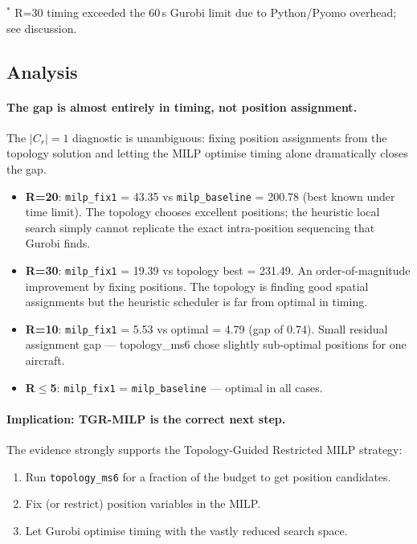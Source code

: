 \noindent $^*$ R=30 timing exceeded the 60\,s Gurobi limit due to Python/Pyomo overhead; see discussion.

\subsection{Analysis}
\label{exp:exp01-analysis}

\paragraph{The gap is almost entirely in timing, not position assignment.}

The $|C_r|=1$ diagnostic is unambiguous: fixing position assignments from the
topology solution and letting the MILP optimise timing alone dramatically
closes the gap.

\begin{itemize}[noitemsep]
    \item \textbf{R=20}: \texttt{milp\_fix1} = 43.35 vs \texttt{milp\_baseline} = 200.78 (best known
          under time limit).  The topology chooses excellent positions; the heuristic
          local search simply cannot replicate the exact intra-position sequencing
          that Gurobi finds.
    \item \textbf{R=30}: \texttt{milp\_fix1} = 19.39 vs topology best = 231.49.
          An order-of-magnitude improvement by fixing positions.  The topology is
          finding good spatial assignments but the heuristic scheduler is far from
          optimal in timing.
    \item \textbf{R=10}: \texttt{milp\_fix1} = 5.53 vs optimal = 4.79 (gap of 0.74).
          Small residual assignment gap — topology\_ms6 chose slightly sub-optimal
          positions for one aircraft.
    \item \textbf{R$\leq$5}: \texttt{milp\_fix1} = \texttt{milp\_baseline} — optimal in all cases.
\end{itemize}

\paragraph{Implication: TGR-MILP is the correct next step.}

The evidence strongly supports the Topology-Guided Restricted MILP strategy:
\begin{enumerate}[noitemsep]
    \item Run \texttt{topology\_ms6} for a fraction of the budget to get position candidates.
    \item Fix (or restrict) position variables in the MILP.
    \item Let Gurobi optimise timing with the vastly reduced search space.
\end{enumerate}

